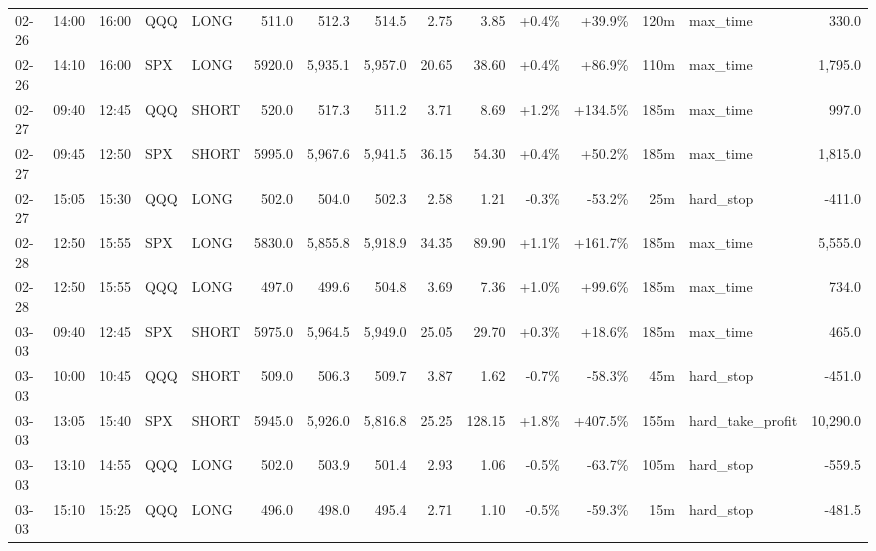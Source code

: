 \documentclass[11pt,a4paper,twoside]{article}
\begin{document}
\begin{landscape}
\begin{center}
\begin{longtable}{>{\color{txtmain}}l l l l l r r r r r r r r >{\color{txtmain}}l r}
02-26 & 14:00 & 16:00 & QQQ & LONG & 511.0 & 512.3 & 514.5 & 2.75 & 3.85 & \textcolor{wingreen}{+0.4\%} & \textcolor{wingreen}{+39.9\%} & 120m & max\_time & \textcolor{wingreen}{330.0} \\
02-26 & 14:10 & 16:00 & SPX & LONG & 5920.0 & 5,935.1 & 5,957.0 & 20.65 & 38.60 & \textcolor{wingreen}{+0.4\%} & \textcolor{wingreen}{+86.9\%} & 110m & max\_time & \textcolor{wingreen}{1,795.0} \\
02-27 & 09:40 & 12:45 & QQQ & SHORT & 520.0 & 517.3 & 511.2 & 3.71 & 8.69 & \textcolor{wingreen}{+1.2\%} & \textcolor{wingreen}{+134.5\%} & 185m & max\_time & \textcolor{wingreen}{997.0} \\
02-27 & 09:45 & 12:50 & SPX & SHORT & 5995.0 & 5,967.6 & 5,941.5 & 36.15 & 54.30 & \textcolor{wingreen}{+0.4\%} & \textcolor{wingreen}{+50.2\%} & 185m & max\_time & \textcolor{wingreen}{1,815.0} \\
02-27 & 15:05 & 15:30 & QQQ & LONG & 502.0 & 504.0 & 502.3 & 2.58 & 1.21 & \textcolor{lossred}{-0.3\%} & \textcolor{lossred}{-53.2\%} & 25m & hard\_stop & \textcolor{lossred}{-411.0} \\
02-28 & 12:50 & 15:55 & SPX & LONG & 5830.0 & 5,855.8 & 5,918.9 & 34.35 & 89.90 & \textcolor{wingreen}{+1.1\%} & \textcolor{wingreen}{+161.7\%} & 185m & max\_time & \textcolor{wingreen}{5,555.0} \\
02-28 & 12:50 & 15:55 & QQQ & LONG & 497.0 & 499.6 & 504.8 & 3.69 & 7.36 & \textcolor{wingreen}{+1.0\%} & \textcolor{wingreen}{+99.6\%} & 185m & max\_time & \textcolor{wingreen}{734.0} \\
03-03 & 09:40 & 12:45 & SPX & SHORT & 5975.0 & 5,964.5 & 5,949.0 & 25.05 & 29.70 & \textcolor{wingreen}{+0.3\%} & \textcolor{wingreen}{+18.6\%} & 185m & max\_time & \textcolor{wingreen}{465.0} \\
03-03 & 10:00 & 10:45 & QQQ & SHORT & 509.0 & 506.3 & 509.7 & 3.87 & 1.62 & \textcolor{lossred}{-0.7\%} & \textcolor{lossred}{-58.3\%} & 45m & hard\_stop & \textcolor{lossred}{-451.0} \\
03-03 & 13:05 & 15:40 & SPX & SHORT & 5945.0 & 5,926.0 & 5,816.8 & 25.25 & 128.15 & \textcolor{wingreen}{+1.8\%} & \textcolor{wingreen}{+407.5\%} & 155m & hard\_take\_profit & \textcolor{wingreen}{10,290.0} \\
03-03 & 13:10 & 14:55 & QQQ & LONG & 502.0 & 503.9 & 501.4 & 2.93 & 1.06 & \textcolor{lossred}{-0.5\%} & \textcolor{lossred}{-63.7\%} & 105m & hard\_stop & \textcolor{lossred}{-559.5} \\
03-03 & 15:10 & 15:25 & QQQ & LONG & 496.0 & 498.0 & 495.4 & 2.71 & 1.10 & \textcolor{lossred}{-0.5\%} & \textcolor{lossred}{-59.3\%} & 15m & hard\_stop & \textcolor{lossred}{-481.5} \\

\end{longtable}
\end{center}
\end{landscape}
\end{document}

